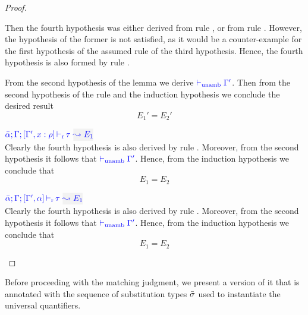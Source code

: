 \begin{proof}
\begin{description}
  Then the fourth hypothesis was either derived from rule ,
  or from rule . However, the hypothesis of the former is
  not satisfied, as it would be a counter-example for the first hypothesis of
  the assumed rule of the third hypothesis. Hence, the fourth hypothesis is also
  formed by rule .

  From the second hypothesis of the lemma we derive ${\color{blue}  \vdash_{\mathrm{unamb}} \Gamma'}$.
  Then from the second hypothesis of the rule and the induction hypothesis we conclude
  the desired result
\begin{equation*}
  E_1' = E_2'
\end{equation*}

\item[\fbox{\rref{L-Var}}]\quad$\dlres{\bar{\alpha}}{\tenv}{\tenv',x:\rulet}{\type}{E_1}$\\

  Clearly the fourth hypothesis is also derived by rule .
  Moreover, from the second hypothesis it follows that ${\color{blue}  \vdash_{\mathrm{unamb}} \Gamma'}$.
  Hence, from the induction hypothesis we conclude that
\begin{equation*}
  E_1 = E_2
\end{equation*}

\item[\fbox{\rref{L-TyVar}}]\quad$\dlres{\bar{\alpha}}{\tenv}{\tenv',\alpha}{\type}{E_1}$\\
  Clearly the fourth hypothesis is also derived by rule .
  Moreover, from the second hypothesis it follows that ${\color{blue}  \vdash_{\mathrm{unamb}} \Gamma'}$.
  Hence, from the induction hypothesis we conclude that
\begin{equation*}
  E_1 = E_2
\end{equation*}
\end{description}
\end{proof}

Before proceeding with the matching judgment, we present a version of it that
is annotated with the sequence of substitution types $\bar{\sigma}$
used to instantiate the universal quantifiers.

